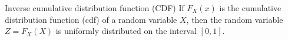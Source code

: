 \begin{frame}{Inverse cumulative distribution function (CDF)}
If $F_{X}(x)$ is the cumulative
  distribution function (cdf) of a random variable $X$, then the
random variable $Z = F_{X}(X)$ is uniformly distributed on the
interval $[0,1]$. 


\end{frame}

